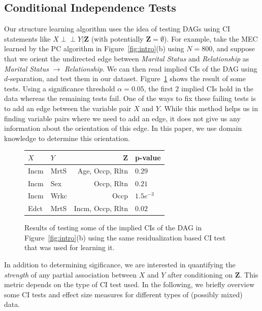\documentclass{uai2025} %
\def\ci{\perp\!\!\!\!\perp}
\begin{document}
\subsection{Conditional Independence Tests}
\label{sec:ci_tests}
Our structure learning algorithm uses the idea of testing DAGs using CI statements
like $ X \ci Y \rvert \bm{Z} $ (with
potentially $ \bm{Z} = \emptyset $).
For example, take the MEC learned by the PC algorithm in
Figure~\ref{fig:intro}(b) using $ N=800 $, and suppose that we orient 
the undirected edge between \emph{Marital Status} and
\emph{Relationship}  as \emph{Marital Status} $ \rightarrow $
\emph{Relationship}. We can then read implied CIs of the DAG using $d$-separation,
and test them in our dataset. Figure~\ref{fig:ci_table} shows the result of some tests. 
Using a significance threshold  $\alpha=0.05 $, the first $ 2 $
implied CIs hold in the data whereas the remaining tests fail. One of the ways
to fix these failing tests is to add an edge between the variable pair $ X $
and $ Y $. While this method helps us in finding variable pairs where we need
to add an edge, it does not give us any information about the orientation of
this edge. In this paper, we use domain knowledge to determine this
orientation.

\begin{figure}
	\centering
	\begin{tabular}{llrl}
		$X$ & $Y$ & $ \bm{Z} $ & p-value \\
		\hline
		Incm & MrtS &  Age, Occp, Rltn & $ 0.29 $     \\
		Incm & Sex  &  Occp, Rltn      & $ 0.21 $     \\
		Incm & Wrkc &  Occp 	       & $ 1.5e^{-3} $ \\
		Edct & MrtS & Incm, Occp, Rltn & $ 0.02 $       \\
		\hline
	\end{tabular}
	\caption{Results of testing some of the implied CIs of the DAG in
		 Figure~\ref{fig:intro}(b) using the same residualization based
	 	 CI test that was used for learning it.}
	\label{fig:ci_table}
\end{figure}

In addition to determining sigificance, we are interested in quantifying the 
\emph{strength} of any partial association between $X$ and $Y$ after conditioning 
on $\mathbf{Z}$. This metric depends on the type of CI test used. In the following,
we briefly overview some CI tests and effect size measures
for different types of (possibly mixed) data.
\end{document}
